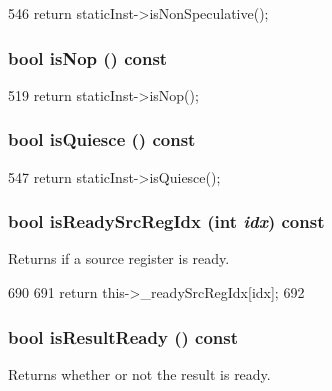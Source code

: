\begin{DoxyCode}
546 { return staticInst->isNonSpeculative(); }
\end{DoxyCode}
\hypertarget{classBaseDynInst_a45dbb9ace4c729e7bb701ce535fb1667}{
\subsubsection[{isNop}]{\setlength{\rightskip}{0pt plus 5cm}bool isNop () const}}
\label{classBaseDynInst_a45dbb9ace4c729e7bb701ce535fb1667}



\begin{DoxyCode}
519 { return staticInst->isNop(); }
\end{DoxyCode}
\hypertarget{classBaseDynInst_adc9467e7b34e8dff3964c85b66bb1b93}{
\subsubsection[{isQuiesce}]{\setlength{\rightskip}{0pt plus 5cm}bool isQuiesce () const}}
\label{classBaseDynInst_adc9467e7b34e8dff3964c85b66bb1b93}



\begin{DoxyCode}
547 { return staticInst->isQuiesce(); }
\end{DoxyCode}
\hypertarget{classBaseDynInst_ad09a59cb16b4b96a42398b3bcd23cd2b}{
\subsubsection[{isReadySrcRegIdx}]{\setlength{\rightskip}{0pt plus 5cm}bool isReadySrcRegIdx (int {\em idx}) const}}
\label{classBaseDynInst_ad09a59cb16b4b96a42398b3bcd23cd2b}
Returns if a source register is ready. 


\begin{DoxyCode}
690     {
691         return this->_readySrcRegIdx[idx];
692     }
\end{DoxyCode}
\hypertarget{classBaseDynInst_aa494f3355348eb3a97ce809b6361e195}{
\subsubsection[{isResultReady}]{\setlength{\rightskip}{0pt plus 5cm}bool isResultReady () const}}
\label{classBaseDynInst_aa494f3355348eb3a97ce809b6361e195}
Returns whether or not the result is ready. 


